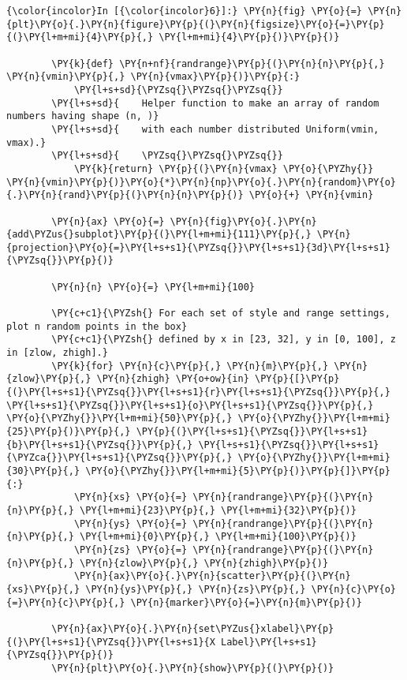     \begin{Verbatim}[commandchars=\\\{\}]
{\color{incolor}In [{\color{incolor}6}]:} \PY{n}{fig} \PY{o}{=} \PY{n}{plt}\PY{o}{.}\PY{n}{figure}\PY{p}{(}\PY{n}{figsize}\PY{o}{=}\PY{p}{(}\PY{l+m+mi}{4}\PY{p}{,} \PY{l+m+mi}{4}\PY{p}{)}\PY{p}{)}
        
        \PY{k}{def} \PY{n+nf}{randrange}\PY{p}{(}\PY{n}{n}\PY{p}{,} \PY{n}{vmin}\PY{p}{,} \PY{n}{vmax}\PY{p}{)}\PY{p}{:}
            \PY{l+s+sd}{\PYZsq{}\PYZsq{}\PYZsq{}}
        \PY{l+s+sd}{    Helper function to make an array of random numbers having shape (n, )}
        \PY{l+s+sd}{    with each number distributed Uniform(vmin, vmax).}
        \PY{l+s+sd}{    \PYZsq{}\PYZsq{}\PYZsq{}}
            \PY{k}{return} \PY{p}{(}\PY{n}{vmax} \PY{o}{\PYZhy{}} \PY{n}{vmin}\PY{p}{)}\PY{o}{*}\PY{n}{np}\PY{o}{.}\PY{n}{random}\PY{o}{.}\PY{n}{rand}\PY{p}{(}\PY{n}{n}\PY{p}{)} \PY{o}{+} \PY{n}{vmin}
        
        \PY{n}{ax} \PY{o}{=} \PY{n}{fig}\PY{o}{.}\PY{n}{add\PYZus{}subplot}\PY{p}{(}\PY{l+m+mi}{111}\PY{p}{,} \PY{n}{projection}\PY{o}{=}\PY{l+s+s1}{\PYZsq{}}\PY{l+s+s1}{3d}\PY{l+s+s1}{\PYZsq{}}\PY{p}{)}
        
        \PY{n}{n} \PY{o}{=} \PY{l+m+mi}{100}
        
        \PY{c+c1}{\PYZsh{} For each set of style and range settings, plot n random points in the box}
        \PY{c+c1}{\PYZsh{} defined by x in [23, 32], y in [0, 100], z in [zlow, zhigh].}
        \PY{k}{for} \PY{n}{c}\PY{p}{,} \PY{n}{m}\PY{p}{,} \PY{n}{zlow}\PY{p}{,} \PY{n}{zhigh} \PY{o+ow}{in} \PY{p}{[}\PY{p}{(}\PY{l+s+s1}{\PYZsq{}}\PY{l+s+s1}{r}\PY{l+s+s1}{\PYZsq{}}\PY{p}{,} \PY{l+s+s1}{\PYZsq{}}\PY{l+s+s1}{o}\PY{l+s+s1}{\PYZsq{}}\PY{p}{,} \PY{o}{\PYZhy{}}\PY{l+m+mi}{50}\PY{p}{,} \PY{o}{\PYZhy{}}\PY{l+m+mi}{25}\PY{p}{)}\PY{p}{,} \PY{p}{(}\PY{l+s+s1}{\PYZsq{}}\PY{l+s+s1}{b}\PY{l+s+s1}{\PYZsq{}}\PY{p}{,} \PY{l+s+s1}{\PYZsq{}}\PY{l+s+s1}{\PYZca{}}\PY{l+s+s1}{\PYZsq{}}\PY{p}{,} \PY{o}{\PYZhy{}}\PY{l+m+mi}{30}\PY{p}{,} \PY{o}{\PYZhy{}}\PY{l+m+mi}{5}\PY{p}{)}\PY{p}{]}\PY{p}{:}
            \PY{n}{xs} \PY{o}{=} \PY{n}{randrange}\PY{p}{(}\PY{n}{n}\PY{p}{,} \PY{l+m+mi}{23}\PY{p}{,} \PY{l+m+mi}{32}\PY{p}{)}
            \PY{n}{ys} \PY{o}{=} \PY{n}{randrange}\PY{p}{(}\PY{n}{n}\PY{p}{,} \PY{l+m+mi}{0}\PY{p}{,} \PY{l+m+mi}{100}\PY{p}{)}
            \PY{n}{zs} \PY{o}{=} \PY{n}{randrange}\PY{p}{(}\PY{n}{n}\PY{p}{,} \PY{n}{zlow}\PY{p}{,} \PY{n}{zhigh}\PY{p}{)}
            \PY{n}{ax}\PY{o}{.}\PY{n}{scatter}\PY{p}{(}\PY{n}{xs}\PY{p}{,} \PY{n}{ys}\PY{p}{,} \PY{n}{zs}\PY{p}{,} \PY{n}{c}\PY{o}{=}\PY{n}{c}\PY{p}{,} \PY{n}{marker}\PY{o}{=}\PY{n}{m}\PY{p}{)}
        
        \PY{n}{ax}\PY{o}{.}\PY{n}{set\PYZus{}xlabel}\PY{p}{(}\PY{l+s+s1}{\PYZsq{}}\PY{l+s+s1}{X Label}\PY{l+s+s1}{\PYZsq{}}\PY{p}{)}
        \PY{n}{plt}\PY{o}{.}\PY{n}{show}\PY{p}{(}\PY{p}{)}
\end{Verbatim}


